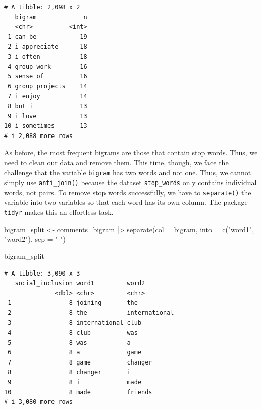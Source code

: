 \documentclass[
  letterpaper,
  DIV=11,
  numbers=noendperiod]{scrreprt}
\newenvironment{Shaded}{\begin{snugshade}}{\end{snugshade}}
\newcommand{\AttributeTok}[1]{\textcolor[rgb]{0.40,0.45,0.13}{#1}}
\newcommand{\FunctionTok}[1]{\textcolor[rgb]{0.28,0.35,0.67}{#1}}
\newcommand{\NormalTok}[1]{\textcolor[rgb]{0.00,0.23,0.31}{#1}}
\newcommand{\OtherTok}[1]{\textcolor[rgb]{0.00,0.23,0.31}{#1}}
\newcommand{\SpecialCharTok}[1]{\textcolor[rgb]{0.37,0.37,0.37}{#1}}
\newcommand{\StringTok}[1]{\textcolor[rgb]{0.13,0.47,0.30}{#1}}
\begin{document}
\begin{verbatim}
# A tibble: 2,098 x 2
   bigram             n
   <chr>          <int>
 1 can be            19
 2 i appreciate      18
 3 i often           18
 4 group work        16
 5 sense of          16
 6 group projects    14
 7 i enjoy           14
 8 but i             13
 9 i love            13
10 i sometimes       13
# i 2,088 more rows
\end{verbatim}

As before, the most frequent bigrams are those that contain stop words.
Thus, we need to clean our data and remove them. This time, though, we
face the challenge that the variable \texttt{bigram} has two words and
not one. Thus, we cannot simply use \texttt{anti\_join()} because the
dataset \texttt{stop\_words} only contains individual words, not pairs.
To remove stop words successfully, we have to \texttt{separate()} the
variable into two variables so that each word has its own column. The
package \texttt{tidyr} makes this an effortless task.

\begin{Shaded}
\begin{Highlighting}[]
\NormalTok{bigram\_split }\OtherTok{\textless{}{-}}
\NormalTok{  comments\_bigram }\SpecialCharTok{|\textgreater{}}
  \FunctionTok{separate}\NormalTok{(}\AttributeTok{col =}\NormalTok{ bigram,}
           \AttributeTok{into =} \FunctionTok{c}\NormalTok{(}\StringTok{"word1"}\NormalTok{, }\StringTok{"word2"}\NormalTok{),}
           \AttributeTok{sep =} \StringTok{" "}\NormalTok{)}

\NormalTok{bigram\_split}
\end{Highlighting}
\end{Shaded}

\begin{verbatim}
# A tibble: 3,090 x 3
   social_inclusion word1         word2        
              <dbl> <chr>         <chr>        
 1                8 joining       the          
 2                8 the           international
 3                8 international club         
 4                8 club          was          
 5                8 was           a            
 6                8 a             game         
 7                8 game          changer      
 8                8 changer       i            
 9                8 i             made         
10                8 made          friends      
# i 3,080 more rows
\end{verbatim}
\end{document}
